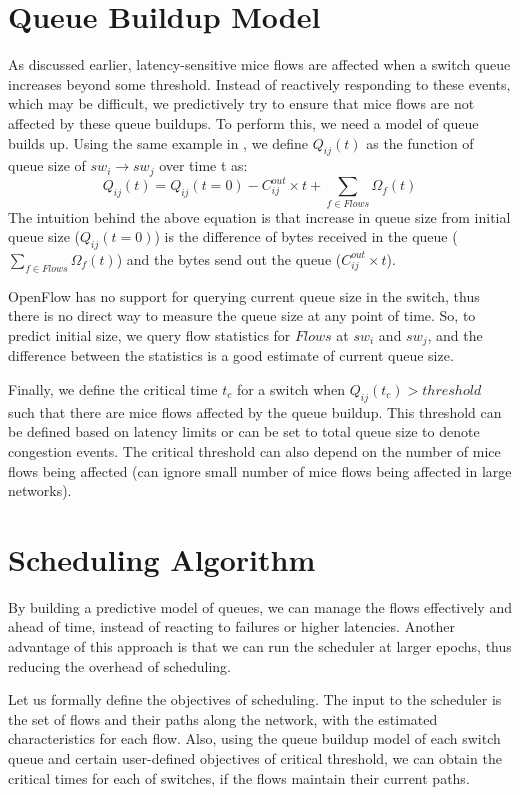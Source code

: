 \section{Queue Buildup Model}
As discussed earlier, latency-sensitive mice flows are affected when a switch queue increases beyond
some threshold. Instead of reactively responding to these events, which may be difficult, we 
predictively try to ensure that mice flows are not affected by these queue buildups. To perform this,
we need a model of queue builds up. Using the same example in , we define $Q_{ij}(t)$ as the function of queue size of $sw_i \rightarrow sw_j$ over time t as:
\begin{equation}
	Q_{ij}(t) = Q_{ij}(t=0) - C_{ij}^{out} \times t + \sum_{f \in Flows} \Omega_f(t)
\end{equation}
The intuition behind the above equation is that increase in queue size from initial
queue size ($Q_{ij}(t=0)$) is the difference of bytes received in the queue ($\sum_{f \in Flows} \Omega_f(t)$) and the bytes send out the queue ($C_{ij}^{out} \times t $). 

OpenFlow has no support for querying current queue size in the switch, thus
there is no direct way to measure the queue size at any point of time. So, to 
predict initial size, we query flow statistics for $Flows$ at $sw_i$ and $sw_j$,
and the difference between the statistics is a good estimate of current queue size.

Finally, we define the critical time $t_c$ for a switch when $Q_{ij}(t_c) > threshold$ such 
that there are mice flows affected by the queue buildup.  This 
threshold can be defined based on latency limits or can be set to total queue size to
denote congestion events. The critical threshold can also depend on the number of 
mice flows being affected (can ignore small number of mice flows being affected in large
networks).

\section{Scheduling Algorithm}
By building a predictive model of queues, we can manage the flows effectively
and ahead of time, instead of reacting to failures or higher latencies. Another advantage 
of this approach is that we can run the scheduler at larger epochs, thus reducing the
overhead of scheduling. 

Let us formally define the objectives of scheduling. The input to the scheduler
is the set of flows and their paths along the network, with the estimated  
characteristics for each flow. Also, using the queue buildup model of each switch
queue and certain user-defined objectives of critical threshold, we can obtain the
critical times for each of switches, if the flows maintain their current paths. 


